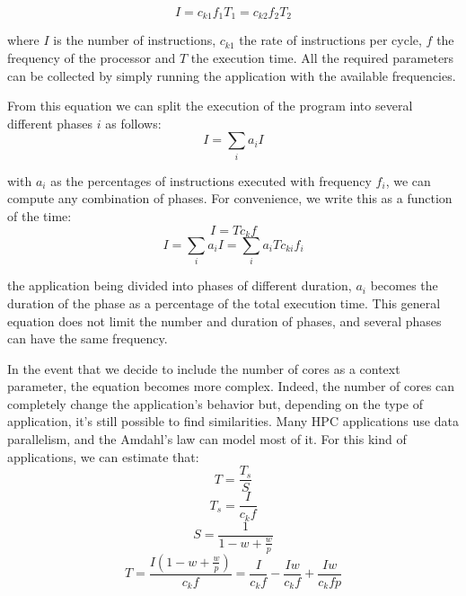 \begin{equation}
    I=c_{k1}f_1T_1=c_{k2}f_2T_2
\end{equation}

where $I$ is the number of instructions, $c_{k1}$ the rate of instructions per cycle, $f$ the frequency of the processor and $T$ the execution time. All the required parameters can be collected by simply running the application with the available frequencies. 

From this equation we can split the execution of the program into several different phases $i$ as follows:
\begin{equation}
    I=\sum_{i}{a_iI} %
\end{equation}

with $a_i$ as the percentages of instructions executed with frequency $f_i$, we can compute any combination of phases. For convenience, we write this as a function of the time:
\begin{equation}
I=Tc_{k}f
\end{equation}
\begin{equation}
    I=\sum_{i}{a_iI}=\sum_i{a_iTc_{ki}f_i}
\end{equation}

the application being divided into phases of different duration, $a_i$  becomes the duration of the phase as a percentage of the total execution time. This general equation does not limit the number and duration of phases, and several phases can have the same frequency. 

In the event that we decide to include the number of cores as a context parameter, the equation becomes more complex. Indeed, the number of cores can completely change the application's behavior but, depending on the type of application, it's still possible to find similarities. Many HPC applications use data parallelism, and the Amdahl's law can model most of it. For this kind of applications, we can estimate that:
\begin{equation}
T=\frac{T_s}{S}
\end{equation}
\begin{equation}
T_s=\frac{I}{c_kf}
\end{equation}
\begin{equation}
S=\frac{1}{1-w+\frac{w}{p}}
\end{equation}
\begin{equation}
T=\frac{I(1-w+\frac{w}{p})}{c_kf}=\frac{I}{c_kf}-\frac{Iw}{c_kf}+\frac{Iw}{c_kfp}
\end{equation}


